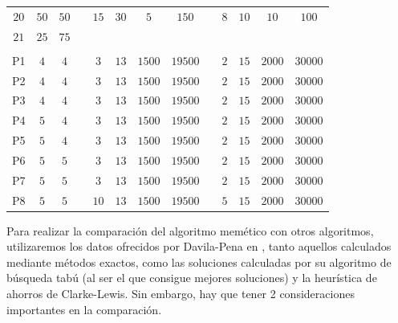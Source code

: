 \begin{table}[!b]
{\begin{tabular}{ccclccrrlccrr}
    $20$ & $50$  & $50$  &  & $15$ & $30$ & \multicolumn{1}{c}{$5$  } & \multicolumn{1}{c}{$150$} &  & $8$  & $10$ & \multicolumn{1}{c}{$10$ }& \multicolumn{1}{c}{$100$} \\
    $21$ & $25$  & $75$  &  &      &      &       &       &  &      &      &      &       \\[-8pt]
      &   &   &  &      &      &       &       &  &      &      &      &       \\
    P1  & $4$  & $4$  &  & $3$  & $13$ & \multicolumn{1}{c}{$1500$} & \multicolumn{1}{c}{$19500$} &  & $2$ & $15$ & \multicolumn{1}{c}{$2000$} & \multicolumn{1}{c}{$30000$} \\
    P2  & $4$  & $4$  &  & $3$  & $13$ & \multicolumn{1}{c}{$1500$} & \multicolumn{1}{c}{$19500$} &  & $2$ & $15$ & \multicolumn{1}{c}{$2000$} & \multicolumn{1}{c}{$30000$} \\
    P3  & $4$  & $4$  &  & $3$  & $13$ & \multicolumn{1}{c}{$1500$} & \multicolumn{1}{c}{$19500$} &  & $2$ & $15$ & \multicolumn{1}{c}{$2000$} & \multicolumn{1}{c}{$30000$} \\
    P4  & $5$  & $4$  &  & $3$  & $13$ & \multicolumn{1}{c}{$1500$} & \multicolumn{1}{c}{$19500$} &  & $2$ & $15$ & \multicolumn{1}{c}{$2000$} & \multicolumn{1}{c}{$30000$} \\
    P5  & $5$  & $4$  &  & $3$  & $13$ & \multicolumn{1}{c}{$1500$} & \multicolumn{1}{c}{$19500$} &  & $2$ & $15$ & \multicolumn{1}{c}{$2000$} & \multicolumn{1}{c}{$30000$} \\
    P6  & $5$  & $5$  &  & $3$  & $13$ & \multicolumn{1}{c}{$1500$} & \multicolumn{1}{c}{$19500$} &  & $2$ & $15$ & \multicolumn{1}{c}{$2000$} & \multicolumn{1}{c}{$30000$} \\
    P7  & $5$  & $5$  &  & $3$  & $13$ & \multicolumn{1}{c}{$1500$} & \multicolumn{1}{c}{$19500$} &  & $2$ & $15$ & \multicolumn{1}{c}{$2000$} & \multicolumn{1}{c}{$30000$} \\
    P8  & $5$  & $5$  &  & $10$  & $13$ & \multicolumn{1}{c}{$1500$} & \multicolumn{1}{c}{$19500$} &  & $5$ & $15$ & \multicolumn{1}{c}{$2000$} & \multicolumn{1}{c}{$30000$} \\
        \hline
    \end{tabular}%
    }    
    \label{tab:instances}
\end{table}
\renewcommand{\arraystretch}{0.9}

Para realizar la comparación del algoritmo memético con otros algoritmos, utilizaremos los datos ofrecidos por Davila-Pena en \cite{laura-mcttrp}, tanto aquellos calculados mediante métodos exactos, como las soluciones calculadas por su algoritmo de búsqueda tabú (al ser el que consigue mejores soluciones) y la heurística de ahorros de Clarke-Lewis. Sin embargo, hay que tener 2 consideraciones importantes en la comparación.


